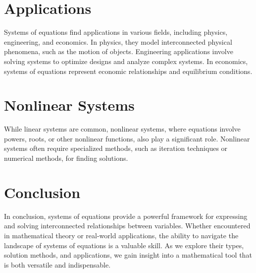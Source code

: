 \documentclass{article}
\begin{document}
\section*{Applications}
Systems of equations find applications in various fields, including physics, engineering, and economics. In physics, they model interconnected physical phenomena, such as the motion of objects. Engineering applications involve solving systems to optimize designs and analyze complex systems. In economics, systems of equations represent economic relationships and equilibrium conditions.

\section*{Nonlinear Systems}
While linear systems are common, nonlinear systems, where equations involve powers, roots, or other nonlinear functions, also play a significant role. Nonlinear systems often require specialized methods, such as iteration techniques or numerical methods, for finding solutions.

\section*{Conclusion}
In conclusion, systems of equations provide a powerful framework for expressing and solving interconnected relationships between variables. Whether encountered in mathematical theory or real-world applications, the ability to navigate the landscape of systems of equations is a valuable skill. As we explore their types, solution methods, and applications, we gain insight into a mathematical tool that is both versatile and indispensable.
\end{document}
